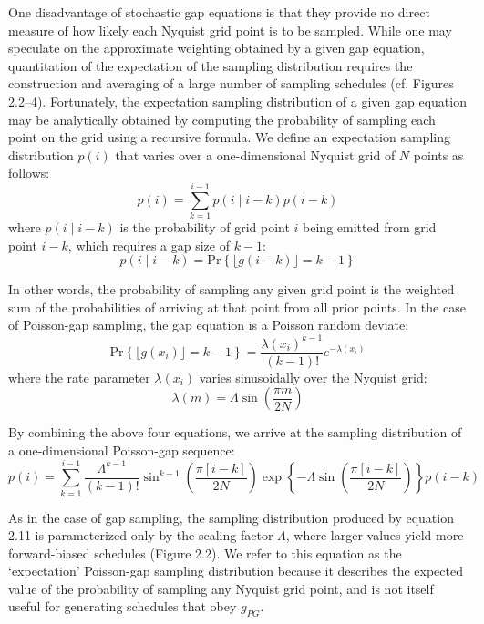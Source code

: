 \begin{doublespace}
One disadvantage of stochastic gap equations is that they provide no direct
measure of how likely each Nyquist grid point is to be sampled. While one may
speculate on the approximate weighting obtained by a given gap equation,
quantitation of the expectation of the sampling distribution requires the
construction and averaging of a large number of sampling schedules
(cf. Figures 2.2--4). Fortunately, the expectation sampling distribution of
a given gap equation may be analytically obtained by computing the probability
of sampling each point on the grid using a recursive formula. We define an
expectation sampling distribution $p(i)$ that varies over a one-dimensional
Nyquist grid of $N$ points as follows:
\begin{equation}
p(i) = \sum_{k=1}^{i-1} p(i \mid i-k) p(i-k)
\end{equation}
where $p(i \mid i-k)$ is the probability of grid point $i$ being emitted from
grid point $i-k$, which requires a gap size of $k-1$:
\begin{equation}
p(i \mid i-k) = \mathrm{Pr}\left\{
 \lfloor g(i-k) \rfloor = k - 1
\right\}
\end{equation}

In other words, the probability of sampling any given grid point is the
weighted sum of the probabilities of arriving at that point from all prior
points. In the case of Poisson-gap sampling, the gap equation is a Poisson
random deviate:
\begin{equation}
\mathrm{Pr}\left\{ \lfloor g(x_i) \rfloor = k - 1 \right\} =
 \frac{\lambda(x_i)^{k-1}}{(k-1)!} e^{-\lambda(x_i)}
\end{equation}
where the rate parameter $\lambda(x_i)$ varies sinusoidally over the Nyquist
grid:
\begin{equation}
\lambda(m) = \Lambda \sin \left( \frac{\pi m}{2 N} \right)
\end{equation}

By combining the above four equations, we arrive at the sampling distribution
of a one-dimensional Poisson-gap sequence:
\begin{equation}
p(i) = \sum_{k=1}^{i-1} \frac{\Lambda^{k-1}}{(k-1)!}
 \sin^{k-1} \left( \frac{\pi [i-k]}{2 N} \right)
 \exp\left\{
  -\Lambda \sin \left( \frac{\pi [i-k]}{2 N} \right)
 \right\}
p(i-k)
\end{equation}

As in the case of gap sampling, the sampling distribution produced by equation
2.11 is parameterized only by the scaling factor $\Lambda$, where larger values
yield more forward-biased schedules (Figure 2.2). We refer to this equation as
the `expectation' Poisson-gap sampling distribution because it describes the
expected value of the probability of sampling any Nyquist grid point, and is
not itself useful for generating schedules that obey $g_{PG}$.
\end{doublespace}

